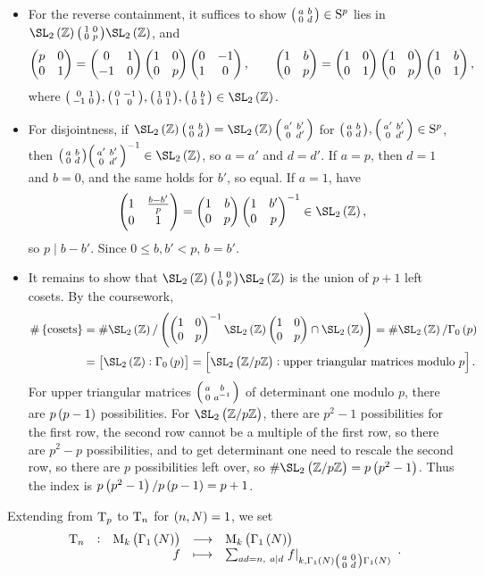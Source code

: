 \begin{itemize}
\item For the reverse containment, it suffices to show $ \begin{psmallmatrix} a & b \\ 0 & d \end{psmallmatrix} \in \mathrm{S}^p $ lies in $ \SL_2\br{\ZZ}\twobytwosmall{1}{0}{0}{p}\SL_2\br{\ZZ} $, and
$$ \begin{pmatrix} p & 0 \\ 0 & 1 \end{pmatrix} = \begin{pmatrix} 0 & 1 \\ -1 & 0 \end{pmatrix}\begin{pmatrix} 1 & 0 \\ 0 & p \end{pmatrix}\begin{pmatrix} 0 & -1 \\ 1 & 0 \end{pmatrix}, \qquad \begin{pmatrix} 1 & b \\ 0 & p \end{pmatrix} = \begin{pmatrix} 1 & 0 \\ 0 & 1 \end{pmatrix}\begin{pmatrix} 1 & 0 \\ 0 & p \end{pmatrix}\begin{pmatrix} 1 & b \\ 0 & 1 \end{pmatrix}, $$
where $ \twobytwosmall{0}{1}{-1}{0}, \twobytwosmall{0}{-1}{1}{0}, \twobytwosmall{1}{0}{0}{1}, \twobytwosmall{1}{b}{0}{1} \in \SL_2\br{\ZZ} $.

\pagebreak

\item For disjointness, if $ \SL_2\br{\ZZ}\twobytwosmall{a}{b}{0}{d} = \SL_2\br{\ZZ}\twobytwosmall{a'}{b'}{0}{d'} $ for $ \begin{psmallmatrix} a & b \\ 0 & d \end{psmallmatrix}, \begin{psmallmatrix} a' & b' \\ 0 & d' \end{psmallmatrix} \in \mathrm{S}^p $, then $ \twobytwosmall{a}{b}{0}{d}\twobytwosmall{a'}{b'}{0}{d'}^{-1} \in \SL_2\br{\ZZ} $, so $ a = a' $ and $ d = d' $. If $ a = p $, then $ d = 1 $ and $ b = 0 $, and the same holds for $ b' $, so equal. If $ a = 1 $, have
$$ \twobytwo{1}{\tfrac{b - b'}{p}}{0}{1} = \twobytwo{1}{b}{0}{p}\twobytwo{1}{b'}{0}{p}^{-1} \in \SL_2\br{\ZZ}, $$
so $ p \mid b - b' $. Since $ 0 \le b, b' < p $, $ b = b' $.
\item It remains to show that $ \SL_2\br{\ZZ}\twobytwosmall{1}{0}{0}{p}\SL_2\br{\ZZ} $ is the union of $ p + 1 $ left cosets. By the coursework,
\begin{align*}
\#\cbr{\text{cosets}}
& = \#\SL_2\br{\ZZ} / \br{\twobytwo{1}{0}{0}{p}^{-1}\SL_2\br{\ZZ}\twobytwo{1}{0}{0}{p} \cap \SL_2\br{\ZZ}}
= \#\SL_2\br{\ZZ} / \Gamma_0\br{p} \\
& = \sbr{\SL_2\br{\ZZ} : \Gamma_0\br{p}}
= \sbr{\SL_2\br{\ZZ / p\ZZ} : \text{upper triangular matrices modulo} \ p}.
\end{align*}
For upper triangular matrices $ \begin{psmallmatrix} a & b \\ 0 & a^{-1} \end{psmallmatrix} $ of determinant one modulo $ p $, there are $ p\br{p - 1} $ possibilities. For $ \SL_2\br{\ZZ / p\ZZ} $, there are $ p^2 - 1 $ possibilities for the first row, the second row cannot be a multiple of the first row, so there are $ p^2 - p $ possibilities, and to get determinant one need to rescale the second row, so there are $ p $ possibilities left over, so $ \#\SL_2\br{\ZZ / p\ZZ} = p\br{p^2 - 1} $. Thus the index is $ p\br{p^2 - 1} / p\br{p - 1} = p + 1 $.
\end{itemize}
Extending from $ \mathrm{T}_p $ to $ \mathrm{T}_n $ for $ \br{n, N} = 1 $, we set
$$ \function[\T_n]{\M_k\br{\Gamma_1\br{N}}}{\M_k\br{\Gamma_1\br{N}}}{f}{\sum_{ad = n, \ a \mid d} \eval{f}_{k, \Gamma_1\br{N}\twobytwosmall{a}{0}{0}{d}\Gamma_1\br{N}}}. $$

